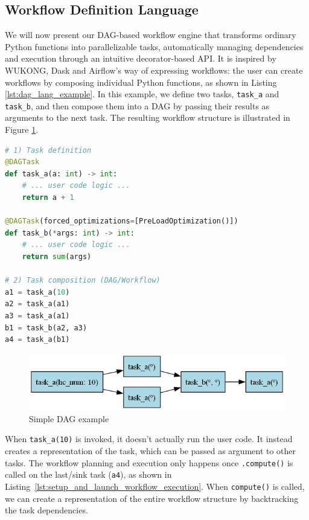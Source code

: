 \documentclass[conference]{IEEEtran}
\begin{document}
\subsection{Workflow Definition Language}
\label{ss:workflow_definition_language}

We will now present our DAG-based workflow engine that transforms ordinary Python functions into parallelizable tasks, automatically managing dependencies and execution through an intuitive decorator-based API. It is inspired by WUKONG, Dask and Airflow's way of expressing workflows: the user can create workflows by composing individual Python functions, as shown in Listing \ref{lst:dag_lang_example}. In this example, we define two tasks, \texttt{task\_a} and \texttt{task\_b}, and then compose them into a DAG by passing their results as arguments to the next task. The resulting workflow structure is illustrated in Figure \ref{fig:dag_lang_example}.

\begin{lstlisting}[language=Python, basicstyle=\ttfamily\footnotesize, columns=fullflexible, breaklines=true, caption=DAG definition example, label=lst:dag_lang_example]
# 1) Task definition
@DAGTask
def task_a(a: int) -> int:
    # ... user code logic ...
    return a + 1

@DAGTask(forced_optimizations=[PreLoadOptimization()])
def task_b(*args: int) -> int:
    # ... user code logic ...
    return sum(args)

# 2) Task composition (DAG/Workflow)
a1 = task_a(10)
a2 = task_a(a1)
a3 = task_a(a1)
b1 = task_b(a2, a3)
a4 = task_a(b1)
\end{lstlisting}

\begin{figure}[h]
    \centering
    \includegraphics[width=\columnwidth]{figures/dag_lang_example.png}
    \caption{Simple DAG example}
    \label{fig:dag_lang_example}
\end{figure}

When \texttt{task\_a(10)} is invoked, it doesn't actually run the user code. It instead creates a representation of the task, which can be passed as argument to other tasks. The workflow planning and execution only happens once \texttt{.compute()} is called on the last/sink task (\texttt{a4}), as shown in Listing~\ref{lst:setup_and_launch_workflow_execution}. When \texttt{compute()} is called, we can create a representation of the entire workflow structure by backtracking the task dependencies.
\end{document}

